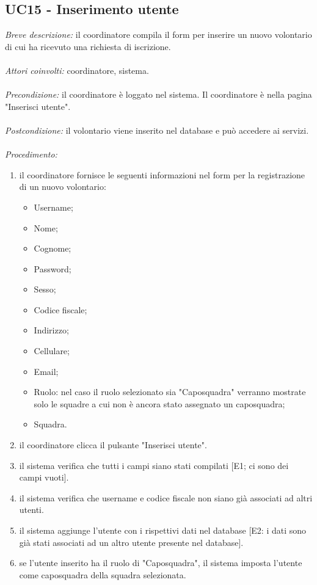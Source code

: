 \subsection{UC15 - Inserimento utente}
\textit{Breve descrizione:} il coordinatore compila il form per inserire un nuovo volontario di cui ha ricevuto una richiesta di iscrizione. 
\\
\\
\textit{Attori coinvolti:} coordinatore, sistema.
\\
\\
\textit{Precondizione:} il coordinatore è loggato nel sistema. Il coordinatore è nella pagina "Inserisci utente".
\\
\\
\textit{Postcondizione:} il volontario viene inserito nel database e può accedere ai servizi.
\\
\\
\textit{Procedimento:}
\begin{enumerate}
	\item il coordinatore fornisce le seguenti informazioni nel form per la registrazione di un nuovo volontario:
	\begin{itemize}
		\item Username;
		\item Nome;
		\item Cognome;
		\item Password;
		\item Sesso;
		\item Codice fiscale;
		\item Indirizzo;
		\item Cellulare;
		\item Email;
		\item Ruolo: nel caso il ruolo selezionato sia "Caposquadra" verranno mostrate solo le squadre a cui non è ancora stato assegnato un caposquadra;
		\item Squadra.
	\end{itemize}
	\item il coordinatore clicca il pulsante "Inserisci utente".
	\item il sistema verifica che tutti i campi siano stati compilati [E1; ci sono dei campi vuoti].
	\item il sistema verifica che username e codice fiscale non siano già associati ad altri utenti.
	\item il sistema aggiunge l'utente con i rispettivi dati nel database [E2: i dati sono già stati associati ad un altro utente presente nel database].
	\item se l'utente inserito ha il ruolo di "Caposquadra", il sistema imposta l'utente come caposquadra della squadra selezionata.
\end{enumerate}



